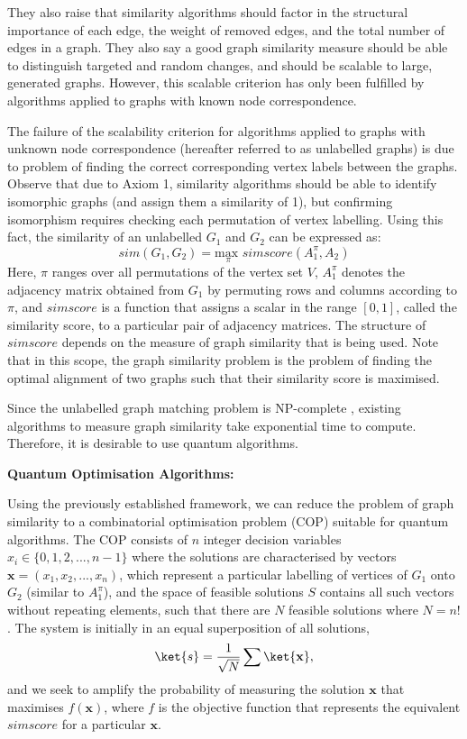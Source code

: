 They also raise that similarity algorithms should factor in the structural importance of each edge, the weight of removed edges, and the total number of edges in a graph. They also say a good graph similarity measure should be able to distinguish targeted and random changes, and should be scalable to large, generated graphs. However, this scalable criterion has only been fulfilled by algorithms applied to graphs with known node correspondence.

The failure of the scalability criterion for algorithms applied to graphs with unknown node correspondence (hereafter referred to as unlabelled graphs) is due to problem of finding the correct corresponding vertex labels between the graphs. Observe that due to Axiom 1, similarity algorithms should be able to identify isomorphic graphs (and assign them a similarity of 1), but confirming isomorphism requires checking each permutation of vertex labelling. Using this fact, the similarity of an unlabelled $G_{1}$ and $G_{2}$ can be expressed as:
$$
sim(G_{1},G_{2})=\underset{\pi}{\text{max }}simscore(A_{1}^{\pi},A_{2})
$$
Here, $\pi$ ranges over all permutations of the vertex set $V$, $A_{1}^{\pi}$ denotes the adjacency matrix obtained from $G_{1}$ by permuting rows and columns according to $\pi$, and $simscore$ is a function that assigns a scalar in the range $[0,1]$, called the similarity score, to a particular pair of adjacency matrices. The structure of $simscore$ depends on the measure of graph similarity that is being used. Note that in this scope, the graph similarity problem is the problem of finding the optimal alignment of two graphs such that their similarity score is maximised.

Since the unlabelled graph matching problem is NP-complete \cite{how_similar}, existing algorithms to measure graph similarity take exponential time to compute. Therefore, it is desirable to use quantum algorithms.

\textbf{Quantum Optimisation Algorithms:}

Using the previously established framework, we can reduce the problem of graph similarity to a combinatorial optimisation problem (COP) suitable for quantum algorithms. The COP consists of $n$ integer decision variables $x_{i}\in \{0,1,2,...,n-1 \}$ where the solutions are characterised by vectors $\mathbf{x}=(x_{1},x_{2},...,x_{n})$, which represent a particular labelling of vertices of $G_{1}$ onto $G_{2}$ (similar to $A_{1}^{\pi}$), and the space of feasible solutions $S$ contains all such vectors without repeating elements, such that there are $N$ feasible solutions where $N=n!$.  The system is initially in an equal superposition of all solutions,
$$
\ket{s} = \frac{1}{\sqrt{N}} \sum \ket{\mathbf{x}},
$$
and we seek to amplify the probability of measuring the solution $\mathbf{x}$ that maximises $f(\mathbf{x})$, where $f$ is the objective function that represents the equivalent $simscore$ for a particular $\mathbf{x}$.

